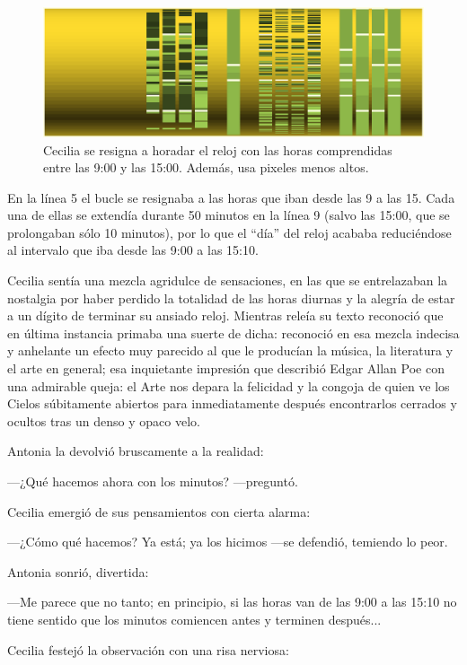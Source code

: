 \begin{figure}[ht]
  \centering
  \includegraphics[width=.95\textwidth]{imagenes/hora-unidades-6}  
  \caption{Cecilia se resigna a horadar el reloj con las horas
    comprendidas entre las 9:00 y las 15:00. Además, usa pixeles menos
    altos.}
  \label{fig:hora-unidades-6}
\end{figure}


En la línea 5 el bucle se resignaba a las horas que iban desde las 9 a
las 15. Cada una de ellas se extendía durante 50 minutos en la línea 9
(salvo las 15:00, que se prolongaban sólo 10 minutos), por lo que el
``día'' del reloj acababa reduciéndose al intervalo que iba desde las
9:00 a las 15:10.

Cecilia sentía una mezcla agridulce de sensaciones, en las que se
entrelazaban la nostalgia por haber perdido la totalidad de las horas
diurnas y la alegría de estar a un dígito de terminar su ansiado
reloj. Mientras releía su texto reconoció que en última instancia
primaba una suerte de dicha: reconoció en esa mezcla indecisa y
anhelante un efecto muy parecido al que le producían la música, la
literatura y el arte en general; esa inquietante impresión que
describió Edgar Allan Poe con una admirable queja: el Arte nos depara
la felicidad y la congoja de quien ve los Cielos súbitamente abiertos
para inmediatamente después encontrarlos cerrados y ocultos tras un
denso y opaco velo.

Antonia la devolvió bruscamente a la realidad:

---¿Qué hacemos ahora con los minutos? ---preguntó.

Cecilia emergió de sus pensamientos con cierta alarma:

---¿Cómo qué hacemos? Ya está; ya los hicimos ---se defendió, temiendo
lo peor.

Antonia sonrió, divertida:

---Me parece que no tanto; en principio, si las horas van de las 9:00
a las 15:10 no tiene sentido que los minutos comiencen antes y
terminen después...

Cecilia festejó la observación con una risa nerviosa:

